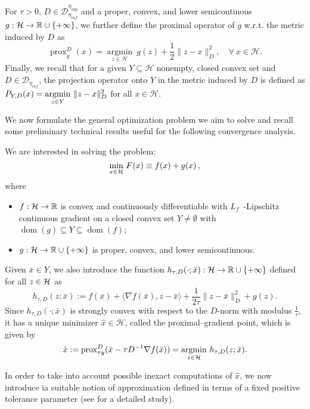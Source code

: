 \documentclass[conference]{IEEEtran}
\begin{document}
For $\tau>0$, $D\in \mathcal{D}_{\eta_{inf}}^{\eta_{sup}}$ and a proper, convex, and lower semicontinous $g:\mathcal H\rightarrow \mathbb R\cup\{+\infty\}$, we further define the proximal operator of $g$ w.r.t. the metric induced by $D$ as 
$$
\operatorname{prox}_{g}^D(x)=\underset{z\in\mathcal{H}}{\operatorname{argmin}} \ g(z)+\frac{1}{2}\|z-x\|_D^2, \quad \forall \ x\in\mathcal{H}.
$$
Finally, we recall that for a given $Y\subseteq \mathcal{H}$ nonempty, closed convex set and $D\in \mathcal{D}_{\eta_{inf}}$, the projection operator onto $Y$ in the metric induced by $D$ is defined as $P_{Y,D}(x)=\underset{z\in Y}{\argmin} \ \|z-x\|^2_D$ for all $x\in\mathcal{H}$.

\medskip

We now formulate the general optimization problem we aim to solve and recall some preliminary technical results useful for the following convergence analysis.


We are interested in solving the problem:
\begin{equation}\label{minf}
{\min_{ {x}\in\mathcal H}} \ F({x}) \equiv f({x}) + g({x}) \, ,
\end{equation}
where
\begin{itemize}
\item $f:\mathcal H\rightarrow \mathbb R$ is convex and continuously differentiable with $L_f$~-Lipschitz continuous gradient on a closed convex set $Y\neq \emptyset$ with $\operatorname{dom}(g)\subseteq Y\subseteq \operatorname{dom}(f)$;
\item $g:\mathcal H\rightarrow \mathbb R\cup\{+\infty\}$ is proper,  convex, and lower semicontinuous.
\end{itemize}
Given $\bar{x}\in Y$, we also introduce the function $h_{\tau,D}(\cdot;\bar{x}):\mathcal H\rightarrow \mathbb R\cup\{+\infty\}$ defined for all $z\in\mathcal H$ as
\begin{equation}\label{eq:function_h}
h_{\tau,D}(z;\bar{x}):=f(\bar{x})+ \langle\nabla f(\bar{x}),z-\bar{x}\rangle+\frac{1}{2\tau}\|z-\bar{x}\|_D^2+g(z).
\end{equation}
Since $h_{\tau,D}(\cdot;\bar{x})$ is  strongly convex with respect to the $D$-norm with modulus $\frac{1}{\tau}$, it  has a unique minimizer $\hat{x}\in\mathcal{H}$, called the proximal--gradient point, which is given by
\begin{equation}\label{eq:prox-grad}
\hat{x}:=\prox_{\tau g}^D(\bar{x}-\tau D^{-1}\nabla f(\bar{x}))=\underset{z\in\H}{\operatorname{argmin}} \ h_{\tau,D}(z;\bar{x}).
\end{equation} 

In order to take into account possible inexact computations of $\hat{x}$, we now introduce ia suitable notion of approximation defined in terms of a fixed positive tolerance parameter (see \cite{Salzo-Villa-2012} for a detailed study).
\end{document}
